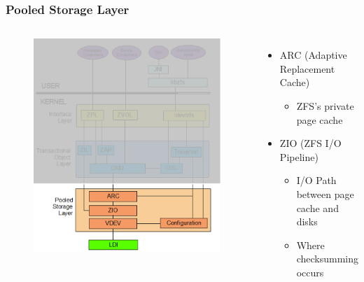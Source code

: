 \begin{frame}[fragile]
    \frametitle{Pooled Storage Layer}

\begin{columns}[c] %


    \begin{figure}
    \includegraphics[width=0.9\linewidth]{figs/ZFS-storage-pool.png}
    \end{figure}


      \begin{itemize}
          \item ARC (Adaptive Replacement Cache)
        \begin{itemize}
            \item ZFS’s private page cache
        \end{itemize}
  
          \item ZIO (ZFS I/O Pipeline)
        \begin{itemize}
            \item I/O Path between page cache and disks
            \item Where checksumming occurs
        \end{itemize}
  

\end{itemize}
\end{columns}
\end{frame}
